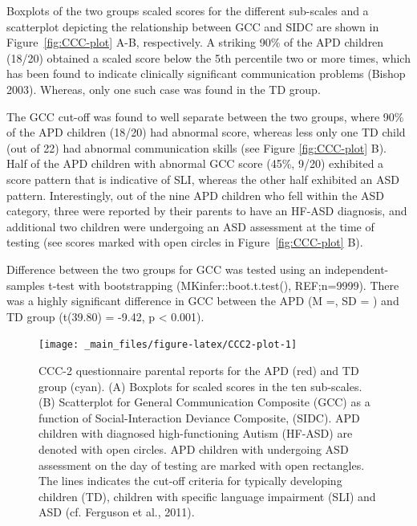 \documentclass[a4paper, twoside]{templates/ociamthesis}
\begin{document}
Boxplots of the two groups scaled scores for the different sub-scales and a scatterplot depicting the relationship between GCC and SIDC are shown in Figure~\ref{fig:CCC-plot} A-B, respectively. A striking 90\% of the APD children (18/20) obtained a scaled score below the 5th percentile two or more times, which has been found to indicate clinically significant communication problems (Bishop 2003). Whereas, only one such case was found in the TD group.

The GCC cut-off was found to well separate between the two groups, where 90\% of the APD children (18/20) had abnormal score, whereas less only one TD child (out of 22) had abnormal communication skills (see Figure \ref{fig:CCC-plot} B). Half of the APD children with abnormal GCC score (45\%, 9/20) exhibited a score pattern that is indicative of SLI, whereas the other half exhibited an ASD pattern. Interestingly, out of the nine APD children who fell within the ASD category, three were reported by their parents to have an HF-ASD diagnosis, and additional two children were undergoing an ASD assessment at the time of testing (see scores marked with open circles in Figure~\ref{fig:CCC-plot} B).

Difference between the two groups for GCC was tested using an independent-samples t-test with bootstrapping (MKinfer::boot.t.test(), REF;n=9999). There was a highly significant difference in GCC between the APD (M =, SD = ) and TD group (t(39.80) = -9.42, p \textless{} 0.001).

\begin{figure}

{\centering \texttt{[image: \_main\_files/figure-latex/CCC2-plot-1]} 

}

\caption{CCC-2 questionnaire parental reports for the APD (red) and TD group (cyan). (A) Boxplots for scaled scores in the ten sub-scales. (B) Scatterplot for General Communication Composite (GCC) as a function of Social-Interaction Deviance Composite, (SIDC). APD children with diagnosed high-functioning Autism (HF-ASD) are denoted with open circles. APD children with undergoing ASD assessment on the day of testing are marked with open rectangles. The lines indicates the cut-off criteria for typically developing children (TD), children with specific language impairment (SLI) and ASD (cf. Ferguson et al., 2011).}\label{fig:CCC2-plot}
\end{figure}
\end{document}
